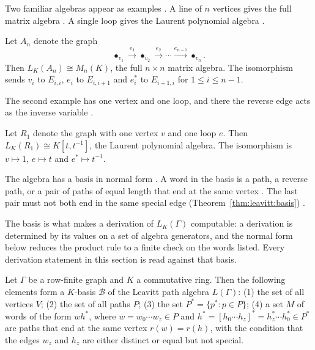 Two familiar algebras appear as examples \cite[p.~61]{Lopatkin2019}. A line of $n$
vertices gives the full matrix algebra \cite[p.~61]{Lopatkin2019}. A single loop
gives the Laurent polynomial algebra \cite[p.~61]{Lopatkin2019}.

\begin{example}\label{ex:leavitt:matrix}
Let $A_{n}$ denote the graph
\begin{equation*}
\bullet_{v_{1}}\xrightarrow{e_{1}}\bullet_{v_{2}}\xrightarrow{e_{2}}\cdots
\xrightarrow{e_{n-1}}\bullet_{v_{n}} .
\end{equation*}
Then $L_{K}(A_{n})\cong M_{n}(K)$, the full $n\times n$ matrix algebra. The
isomorphism sends $v_{i}$ to $E_{i,i}$, $e_{i}$ to $E_{i,i+1}$ and $e^{*}_{i}$ to
$E_{i+1,i}$ for $1\le i\le n-1$.
\end{example}

The second example has one vertex and one loop, and there the reverse edge acts as
the inverse variable \cite[p.~61]{Lopatkin2019}.

\begin{example}\label{ex:leavitt:laurent}
Let $R_{1}$ denote the graph with one vertex $v$ and one loop $e$. Then
$L_{K}(R_{1})\cong K[t,t^{-1}]$, the Laurent polynomial algebra. The isomorphism is
$v\mapsto 1$, $e\mapsto t$ and $e^{*}\mapsto t^{-1}$.
\end{example}

The algebra has a basis in normal form \cite[p.~63]{Lopatkin2019}. A word in the
basis is a path, a reverse path, or a pair of paths of equal length that end at the
same vertex \cite[p.~63]{Lopatkin2019}. The last pair must not both end in the same
special edge (Theorem~\ref{thm:leavitt:basis}) \cite[p.~63]{Lopatkin2019}.

The basis is what makes a derivation of $L_K(\Gamma)$ computable: a derivation is
determined by its values on a set of algebra generators, and the normal form
below reduces the product rule to a finite check on the words listed. Every
derivation statement in this section is read against that basis.

\begin{theorem}\label{thm:leavitt:basis}
Let $\Gamma$ be a row-finite graph and $K$ a commutative ring. Then the following
elements form a $K$-basis $\mathcal B$ of the Leavitt path algebra $L(\Gamma)$:
(1) the set of all vertices $V$; (2) the set of all paths $P$; (3) the set
$P^{*}=\{p^{*}\colon p\in P\}$; (4) a set $M$ of words of the form $wh^{*}$, where
$w=w_{0}\cdots w_{z}\in P$ and $h^{*}=[h_{0}\cdots h_{z}]^{*}=h^{*}_{z}\cdots h^{*}_{0}\in P^{*}$
are paths that end at the same vertex $r(w)=r(h)$, with the condition that the edges
$w_{z}$ and $h_{z}$ are either distinct or equal but not special.
\end{theorem}

